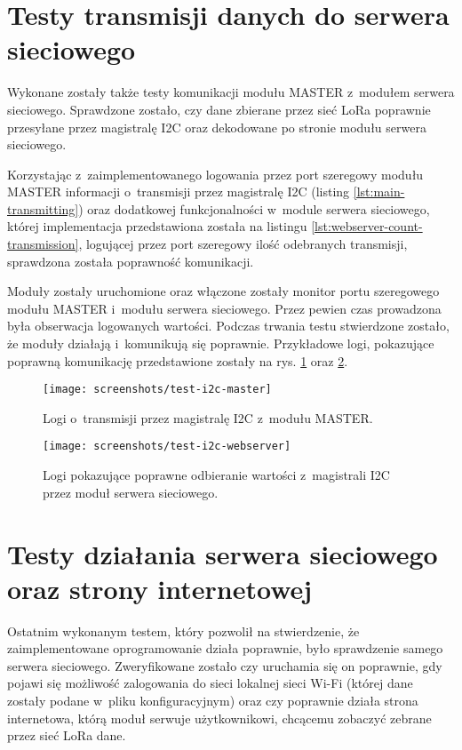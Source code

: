 \FloatBarrier
\section{\label{sect:test-webserver-comm}Testy transmisji danych do serwera sieciowego} Wykonane zostały także testy
komunikacji modułu MASTER z~modułem serwera sieciowego. Sprawdzone zostało, czy dane zbierane przez sieć LoRa poprawnie
przesyłane przez magistralę I2C oraz dekodowane po stronie modułu serwera sieciowego.

Korzystając z~zaimplementowanego logowania przez port szeregowy modułu MASTER informacji o~transmisji przez magistralę
I2C (listing \ref{lst:main-transmitting}) oraz dodatkowej funkcjonalności w~module serwera sieciowego, której
implementacja przedstawiona została na listingu \ref{lst:webserver-count-transmission}, logującej przez port szeregowy
ilość odebranych transmisji, sprawdzona została poprawność komunikacji.



Moduły zostały uruchomione oraz włączone zostały monitor portu szeregowego modułu MASTER i~modułu serwera sieciowego.
Przez pewien czas prowadzona była obserwacja logowanych wartości. Podczas trwania testu stwierdzone zostało, że moduły
działają i~komunikują się poprawnie. Przykładowe logi, pokazujące poprawną komunikację przedstawione zostały na rys.
\ref{img:test-i2c-master} oraz \ref{img:test-i2c-webserver}.

\begin{figure}[!htbp]
    \centering
    \texttt{[image: screenshots/test-i2c-master]}
    \caption{\label{img:test-i2c-master}Logi o~transmisji przez magistralę I2C z~modułu MASTER.}
\end{figure}

\begin{figure}[!htbp]
    \centering
    \texttt{[image: screenshots/test-i2c-webserver]}
    \caption{\label{img:test-i2c-webserver}Logi pokazujące poprawne odbieranie wartości z~magistrali I2C przez moduł
        serwera sieciowego.}
\end{figure}

\FloatBarrier
\section{\label{sect:test-webserver-website}Testy działania serwera sieciowego oraz strony internetowej} Ostatnim
wykonanym testem, który pozwolił na stwierdzenie, że zaimplementowane oprogramowanie działa poprawnie, było sprawdzenie
samego serwera sieciowego. Zweryfikowane zostało czy uruchamia się on poprawnie, gdy pojawi się możliwość zalogowania do
sieci lokalnej sieci Wi-Fi (której dane zostały podane w~pliku konfiguracyjnym) oraz czy poprawnie działa strona
internetowa, którą moduł serwuje użytkownikowi, chcącemu zobaczyć zebrane przez sieć LoRa dane.

